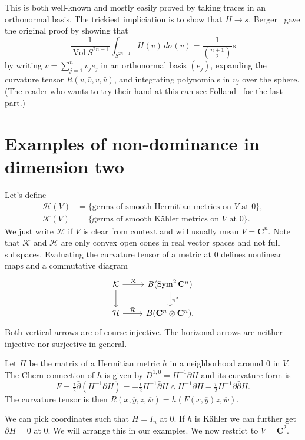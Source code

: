 \documentclass[10pt,a4paper]{amsart}
\theoremstyle{definition}
\def\ov#1{\overline{#1}}
\newcommand{\kk}[1]{\mathbf{#1}}
\newcommand{\cc}[1]{\mathcal{#1}}
\DeclareMathOperator{\Vol}{Vol}
\begin{document}
This is both well-known and mostly easily proved by taking traces in an
orthonormal basis.
The trickiest impliciation is to show that $H \to s$.
Berger~\cite{berger1965varietes} gave the original proof by showing that
$$
\frac{1}{\Vol S^{2n-1}} \int_{S^{2n-1}} \!\!\! H(v) \, d\sigma(v)
= \frac{1}{\binom{n+1}{2}} s
$$
by writing $v = \sum_{j=1}^n v_j e_j$ in an orthonormal basis $(e_j)$,
expanding the curvature tensor $R(v, \bar v, v, \bar v)$, and integrating
polynomials in $v_j$ over the sphere. (The reader who wants to try their
hand at this can see Folland~\cite{folland} for the last part.)


\section{Examples of non-dominance in dimension two}

Let's define
\begin{align*}
\cc H(V)
&= \{ \text{germs of smooth Hermitian metrics on $V$ at $0$} \},
\\
\cc K(V)
&= \{ \text{germs of smooth K\"ahler metrics on $V$ at $0$} \}.
\end{align*}
We just write $\cc H$ if $V$ is clear from context and will usually mean $V =
\kk C^n$. Note that $\cc K$ and $\cc H$ are only convex open cones in real
vector spaces and not full subspaces.
Evaluating the curvature tensor of a metric at $0$ defines nonlinear maps and a
commutative diagram
$$
\begin{tikzcd}
\cc K \ar[d] \ar[r,"\cc R"] & B(\operatorname{Sym}^2 \kk C^n)\ar[d,"\pi^*"]
\\
\cc H \ar[r, "\cc R"] & B(\kk C^n \otimes \kk C^n).
\end{tikzcd}
$$
Both vertical arrows are of course injective.
The horizonal arrows are neither injective nor surjective in general.


Let $H$ be the matrix of a Hermitian metric $h$ in a neighborhood around $0$ in
$V$. The Chern connection of $h$ is given by $D^{1,0} = H^{-1}\partial H$ and its
curvature form is
$$
F = \tfrac i2 \bar\partial(H^{-1}\partial H)
= - \tfrac i2 H^{-1} \bar\partial H \wedge H^{-1} \partial H
- \tfrac i2 H^{-1} \partial \bar\partial H.
$$
The curvature tensor is then $R(x,\ov y, z, \ov w) = h(F(x, \ov y) z, \ov w)$.

We can pick coordinates such that $H = I_n$ at $0$.
If $h$ is K\"ahler we can further get $\partial H = 0$ at $0$.
We will arrange this in our examples.
We now restrict to $V = \kk C^2$.
\end{document}
